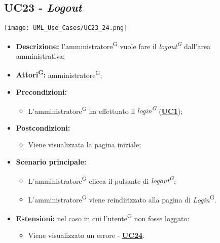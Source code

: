 \subsection{UC23 - \textit{Logout}}
\label{sec:UC23}
\texttt{[image: UML\_Use\_Cases/UC23\_24.png]}
\begin{itemize}
	\item \textbf{Descrizione:} l'amministratore\textsuperscript{G} vuole fare il \textit{logout\textsuperscript{G}} dall'area amministrativa; 
	\item \textbf{Attori\textsuperscript{G}:} amministratore\textsuperscript{G};
	\item \textbf{Precondizioni:} 
	\begin{itemize}
		\item L’amministratore\textsuperscript{G} ha effettuato il \textit{login\textsuperscript{G}} (\hyperref[sec:UC1]{\textbf{UC1}});
	\end{itemize}
	\item \textbf{Postcondizioni:} 
	\begin{itemize}
		\item Viene visualizzata la pagina iniziale;
	\end{itemize}
	\item \textbf{Scenario principale:} 
	\begin{itemize}
		\item L’amministratore\textsuperscript{G} clicca il pulsante di \textit{logout\textsuperscript{G}};
		\item L’amministratore\textsuperscript{G} viene reindirizzato alla pagina di \textit{Login}\textsuperscript{G}.
	\end{itemize}
	\item \textbf{Estensioni:} nel caso in cui l'utente\textsuperscript{G} non fosse loggato:
	\begin{itemize}
		\item Viene visualizzato un errore - \hyperref[sec:UC24]{\textbf{UC24}}.
	\end{itemize}
\end{itemize}

